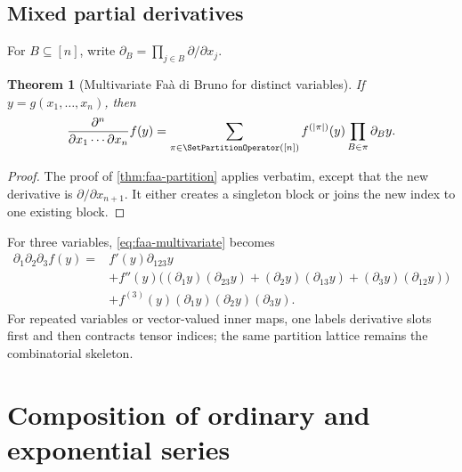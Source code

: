 \documentclass[11pt,a4paper,oneside,openany]{book}
\newtheorem{theorem}{Theorem}[chapter]
\theoremstyle{definition}
\theoremstyle{remark}
\begin{document}
\section{Mixed partial derivatives}
For $B\subseteq[n]$, write
$\partial_B=\prod_{j\in B}\partial/\partial x_j$.
\begin{theorem}[Multivariate Fa\`a di Bruno for distinct variables]
\label{thm:faa-multivariate}
If $y=g(x_1,\ldots,x_n)$, then
\begin{equation}\label{eq:faa-multivariate}
 \frac{\partial^n}{\partial x_1\cdots\partial x_n}f(y)
 =\sum_{\pi\in\SetPartitionOperator([n])}f^{(|\pi|)}(y)
   \prod_{B\in\pi}\partial_B y.
\end{equation}
\end{theorem}
\begin{proof}
The proof of \cref{thm:faa-partition} applies verbatim, except that the new
derivative is $\partial/\partial x_{n+1}$.  It either creates a singleton block or
joins the new index to one existing block.
\end{proof}

For three variables, \eqref{eq:faa-multivariate} becomes
\begin{align*}
 \partial_1\partial_2\partial_3f(y)
 ={}&f'(y)\partial_{123}y\\
 &+f''(y)\bigl((\partial_1y)(\partial_{23}y)
 +(\partial_2y)(\partial_{13}y)+(\partial_3y)(\partial_{12}y)\bigr)\\
 &+f^{(3)}(y)(\partial_1y)(\partial_2y)(\partial_3y).
\end{align*}
For repeated variables or vector-valued inner maps, one labels derivative slots
first and then contracts tensor indices; the same partition lattice remains the
combinatorial skeleton.

\chapter{Composition of ordinary and exponential series}
\end{document}
